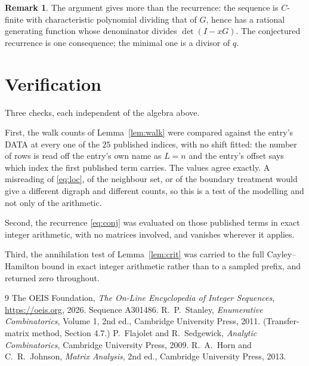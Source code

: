 \documentclass[11pt,a4paper]{article}
\theoremstyle{plain}
\theoremstyle{definition}
\newtheorem{remark}[theorem]{Remark}
\begin{document}
\begin{remark}
The argument gives more than the recurrence: the sequence is $C$-finite with characteristic
polynomial dividing that of $G$, hence has a rational generating function whose denominator
divides $\det(I-xG)$. The conjectured recurrence is one consequence; the minimal one is a
divisor of $q$.
\end{remark}

\section{Verification}

Three checks, each independent of the algebra above.

First, the walk counts of Lemma~\ref{lem:walk} were compared against the entry's DATA at
every one of the $25$ published indices, with no shift fitted: the number of rows is
read off the entry's own name as $L=n$ and the entry's offset says which index the first
published term carries. The values agree exactly. A misreading of \eqref{eq:loc}, of the
neighbour set, or of the boundary treatment would give a different digraph and different
counts, so this is a test of the modelling and not only of the arithmetic.

Second, the recurrence \eqref{eq:conj} was evaluated on those published terms in exact
integer arithmetic, with no matrices involved, and vanishes wherever it applies.

Third, the annihilation test of Lemma~\ref{lem:crit} was carried to the full
Cayley--Hamilton bound in exact integer arithmetic rather than to a sampled prefix, and
returned zero throughout.

\begin{thebibliography}{9}
 The OEIS Foundation, \emph{The On-Line Encyclopedia of Integer
Sequences}, \url{https://oeis.org}, 2026. Sequence A301486.
 R.~P.~Stanley, \emph{Enumerative Combinatorics}, Volume 1, 2nd ed.,
Cambridge University Press, 2011. (Transfer-matrix method, Section 4.7.)
 P.~Flajolet and R.~Sedgewick, \emph{Analytic Combinatorics}, Cambridge
University Press, 2009.
 R.~A.~Horn and C.~R.~Johnson, \emph{Matrix Analysis}, 2nd ed., Cambridge
University Press, 2013.
\end{thebibliography}
\end{document}
